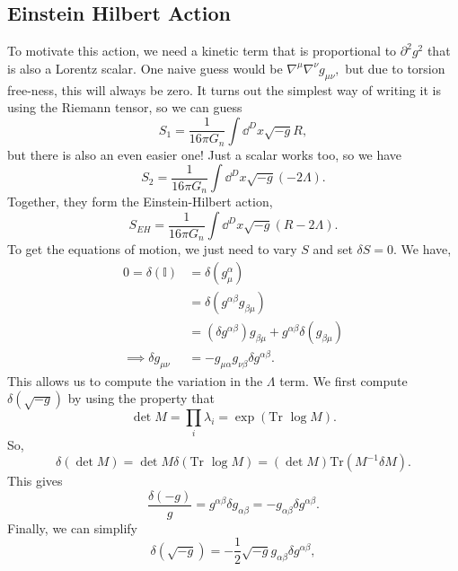 \documentclass{article}
\numberwithin{equation}{section}
\begin{document}
 \subsection{Einstein Hilbert Action}
 To motivate this action, we need a kinetic term that is proportional to $\partial^2 g^2$ that is also a Lorentz scalar. One naive guess would be $\nabla^\mu \nabla^{\nu} g_{\mu\nu},$ but due to torsion free-ness, this will always be zero. It turns out the simplest way of writing it is using the Riemann tensor, so we can guess 
 \begin{equation}
    S_1 = \frac{1}{16\pi G_n}\int\dd^D{x}\sqrt{-g}R,
 \end{equation}
 but there is also an even easier one! Just a scalar works too, so we have 
 \begin{equation}
    S_2 = \frac{1}{16\pi G_n}\int\dd^D{x}\sqrt{-g}(-2\Lambda).
 \end{equation}
 Together, they form the Einstein-Hilbert action,
 \begin{equation}
    \boxed{S_{EH} = \frac{1}{16\pi G_n}\int\dd^D{x}\sqrt{-g}(R-2\Lambda).}
 \end{equation}
 To get the equations of motion, we just need to vary $S$ and set $\delta S=0.$ We have,
 \begin{align}
    0 = \delta(\mathbb{I}) &= \delta(g^{\alpha}_{\mu}) \\ 
    &=\delta(g^{\alpha\beta}g_{\beta\mu}) \\ 
    &= (\delta g^{\alpha\beta})g_{\beta\mu} + g^{\alpha\beta}\delta(g_{\beta\mu}) \\ 
    \implies \delta g_{\mu\nu} &= -g_{\mu\alpha}g_{\nu\beta}\delta g^{\alpha\beta}.
 \end{align}
 This allows us to compute the variation in the $\Lambda$ term. We first compute $\delta (\sqrt{-g})$ by using the property that 
 \begin{equation}
    \det M = \prod_i \lambda_i = \exp\left(\text{Tr }\log M\right).
 \end{equation}
 So,
 \begin{equation}
    \delta(\det M) = \det M \delta(\text{Tr }\log M) = (\det M)\text{Tr}(M^{-1}\delta M).
 \end{equation}
 This gives 
 \begin{equation}
    \frac{\delta(-g)}{g} = g^{\alpha\beta}\delta g_{\alpha\beta} = -g_{\alpha\beta}\delta g^{\alpha\beta}.
 \end{equation}
 Finally, we can simplify 
 \begin{equation}
    \delta(\sqrt{-g}) = -\frac{1}{2}\sqrt{-g}g_{\alpha\beta}\delta g^{\alpha\beta},
 \end{equation}
\end{document}
